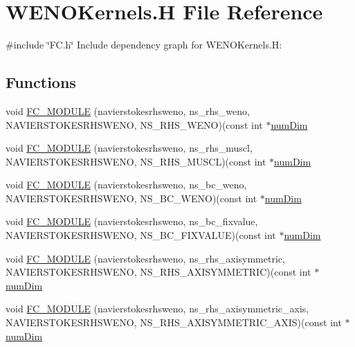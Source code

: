 \hypertarget{WENOKernels_8H}{}\section{W\+E\+N\+O\+Kernels.\+H File Reference}
\label{WENOKernels_8H}
{\ttfamily \#include \char`\"{}F\+C.\+h\char`\"{}}\newline
Include dependency graph for W\+E\+N\+O\+Kernels.\+H\+:
\subsection*{Functions}
\begin{DoxyCompactItemize}
\item 
void \hyperlink{WENOKernels_8H_a2a859b5bf49701195b627a1569db8786}{F\+C\+\_\+\+M\+O\+D\+U\+LE} (navierstokesrhsweno, ns\+\_\+rhs\+\_\+weno, N\+A\+V\+I\+E\+R\+S\+T\+O\+K\+E\+S\+R\+H\+S\+W\+E\+NO, N\+S\+\_\+\+R\+H\+S\+\_\+\+W\+E\+NO)(const int $\ast$\hyperlink{SATKernels_8H_a680185db8546de161968dabace9e94f1}{num\+Dim}
\item 
void \hyperlink{WENOKernels_8H_a718c5e2eb65c70474c25d43bf09fe199}{F\+C\+\_\+\+M\+O\+D\+U\+LE} (navierstokesrhsweno, ns\+\_\+rhs\+\_\+muscl, N\+A\+V\+I\+E\+R\+S\+T\+O\+K\+E\+S\+R\+H\+S\+W\+E\+NO, N\+S\+\_\+\+R\+H\+S\+\_\+\+M\+U\+S\+CL)(const int $\ast$\hyperlink{SATKernels_8H_a680185db8546de161968dabace9e94f1}{num\+Dim}
\item 
void \hyperlink{WENOKernels_8H_a3ca2a5876d7cbc246653331851da70c4}{F\+C\+\_\+\+M\+O\+D\+U\+LE} (navierstokesrhsweno, ns\+\_\+bc\+\_\+weno, N\+A\+V\+I\+E\+R\+S\+T\+O\+K\+E\+S\+R\+H\+S\+W\+E\+NO, N\+S\+\_\+\+B\+C\+\_\+\+W\+E\+NO)(const int $\ast$\hyperlink{SATKernels_8H_a680185db8546de161968dabace9e94f1}{num\+Dim}
\item 
void \hyperlink{WENOKernels_8H_a096e82a2715e832a4cc81bc36a722b95}{F\+C\+\_\+\+M\+O\+D\+U\+LE} (navierstokesrhsweno, ns\+\_\+bc\+\_\+fixvalue, N\+A\+V\+I\+E\+R\+S\+T\+O\+K\+E\+S\+R\+H\+S\+W\+E\+NO, N\+S\+\_\+\+B\+C\+\_\+\+F\+I\+X\+V\+A\+L\+UE)(const int $\ast$\hyperlink{SATKernels_8H_a680185db8546de161968dabace9e94f1}{num\+Dim}
\item 
void \hyperlink{WENOKernels_8H_ae693728c8ee546240722f63e3a85830a}{F\+C\+\_\+\+M\+O\+D\+U\+LE} (navierstokesrhsweno, ns\+\_\+rhs\+\_\+axisymmetric, N\+A\+V\+I\+E\+R\+S\+T\+O\+K\+E\+S\+R\+H\+S\+W\+E\+NO, N\+S\+\_\+\+R\+H\+S\+\_\+\+A\+X\+I\+S\+Y\+M\+M\+E\+T\+R\+IC)(const int $\ast$\hyperlink{SATKernels_8H_a680185db8546de161968dabace9e94f1}{num\+Dim}
\item 
void \hyperlink{WENOKernels_8H_af6795ebf410b27f3d5a4249f7fa73edc}{F\+C\+\_\+\+M\+O\+D\+U\+LE} (navierstokesrhsweno, ns\+\_\+rhs\+\_\+axisymmetric\+\_\+axis, N\+A\+V\+I\+E\+R\+S\+T\+O\+K\+E\+S\+R\+H\+S\+W\+E\+NO, N\+S\+\_\+\+R\+H\+S\+\_\+\+A\+X\+I\+S\+Y\+M\+M\+E\+T\+R\+I\+C\+\_\+\+A\+X\+IS)(const int $\ast$\hyperlink{SATKernels_8H_a680185db8546de161968dabace9e94f1}{num\+Dim}
\end{DoxyCompactItemize}
